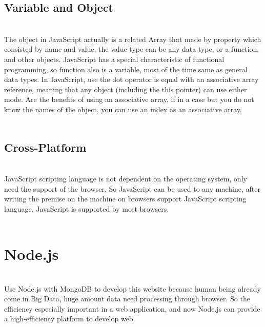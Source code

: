 \subsection{Variable and Object} 
\\
The object in JavaScript actually is a related Array that made by property which consisted by name and value, the value type can be any data type, or a function, and other objects. JavaScript has a special characteristic of functional programming, so function also is a variable, most of the time same as general data types. In JavaScript, use the dot operator is equal with an associative array reference, meaning that any object (including the this pointer) can use either mode. Are the benefits of using an associative array, if in a case but you do not know the names of the object, you can use an index as an associative array.\\ 
\\
\subsection{Cross-Platform}
\\
JavaScript scripting language is not dependent on the operating system, only need the support of the browser. So JavaScript can be used to any machine, after writing the premise on the machine on browsers support JavaScript scripting language, JavaScript is supported by most browsers.\\
\\
\section{Node.js}\cite{1}
\\
Use Node.js with MongoDB to develop this website because human being already come in Big Data, huge amount data need processing through browser. So the efficiency especially important in a web application, and now Node.js can provide a high-efficiency platform to develop web.\\
\\
